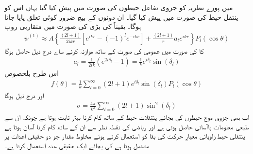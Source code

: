 \documentclass[leqno, b5paper]{khalid-urdu-book}
\begin{document}
 میں پورے نظریہ کو جزوی تفاعل حیطوں  کی صورت میں پیش کیا گیا یہاں اس کو ینتقل حیط  کی صورت میں پیش کیا گیا۔ ان دونوں کے بیچ ضرور کوئی تعلق پایا جاتا ہوگا۔ یقیناً  کی بڑی  کی صورت میں متقاربی روپ 
\begin{align}
	\psi^{(1)}\approx A\left\{\frac{(2l+1)}{2ikr}\left[e^{ikr}-(-1)^le^{-ikr}\right]+\frac{(2l+1)}{r}a_le^{ikr}\right\}P_l(\cos\theta)
\end{align}
کا  کی صورت میں عمومی کی صورت  کے ساتھ موازنہ کرنے ساے درج ذیل حاصل ہوگا
\begin{align}
	a_l=\frac{1}{2ik}\left(e^{2i\delta_l}-1\right)=\frac{1}{k}e^{i\delta_l}\sin(\delta_l)
\end{align}
اس طرح بلخصوص  
\begin{align}
	f(\theta) = \frac{1}{k}\sum_{l=0}^{\infty}(2l+1)e^{i\delta_l}\sin(\delta_l)P_l(\cos\theta)
\end{align}
اور درج ذیل ہوگا  
\begin{align}
	\sigma=\frac{4\pi}{k^2}\sum_{l=0}^{\infty}(2l+1)\sin^2(\delta_l)
\end{align}
اب بھی جزوی موج حیطوں کی بجائے ینتقلات حیط کے ساتھ کام کرنا بہتر ثابت ہوتا ہے چونکہ ان سے طبعی معلومات باآسانی حاصل ہوتی ہے اور ریاضی کی نقطہ نظر سے ان کے ساتھ کام کرنا آسان ہوتا ہے ینتقلی حیط زاویائی معیارِ حرکت کی بقا کو استعمال کرتے ہوئے مخلوط مقدار  جو دو حقیقی اعدات پر مشتمل ہوتا ہے کی بجائے ایک حقیقی عدد  استعمال کرتا ہے۔
\end{document}
